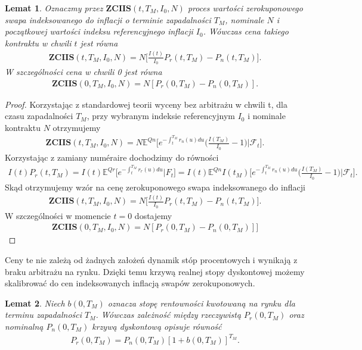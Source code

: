 \documentclass{mini}
\theoremstyle{mythstyle}
\newtheorem{Lemat}{Lemat}[chapter]
\begin{document}
	\begin{Lemat}
		Oznaczmy przez $\textbf{ZCIIS}(t,T_M,I_0,N)$ proces wartości zerokuponowego swapa indeksowanego do inflacji o terminie zapadalności $T_M$, nominale $N$ i początkowej wartości indeksu referencyjnego inflacji $I_0$. Wówczas cena takiego kontraktu w chwili $t$ jest równa
		\begin{eqnarray}
			\textbf{ZCIIS} (t,T_M,I_0,N) = N \bigg[\frac{I(t)}{I_0} P_r(t,T_M) - P_n(t,T_M)\bigg].
		\end{eqnarray}
		W szczególności cena w chwili 0 jest równa
		\begin{eqnarray}
			\textbf{ZCIIS} (0,T_M,I_0,N) = N [P_r(0,T_M) - P_n(0,T_M)].
		\end{eqnarray}
	\end{Lemat}
	\begin{proof}
	Korzystając z standardowej teorii wyceny bez arbitrażu w chwili t, dla czasu zapadalności $T_M$, przy wybranym indeksie referencyjnym $I_0$ i nominale kontraktu $N$ otrzymujemy
	\begin{eqnarray}
		\textbf{ZCIIS} (t,T_M,I_0,N) = N \mathbb{E}^{Qn} \bigg[e^{-\int_t^{T_M}r_n(u)du}\bigg(\frac{I(T_M)}{I_0}-1\bigg) \bigg| \mathcal{F}_t\bigg].
	\end{eqnarray}
	Korzystając z zamiany num\'{e}raire dochodzimy do równości
	\begin{eqnarray*}
		I(t) P_r (t,T_M) = I(t) \mathbb{E}^{Qr} \bigg[e^{-\int_t^{T_M}r_r(u)du} \bigg| F_t\bigg] = I(t) \mathbb{E}^{Qn} I(t_M) \bigg[e^{-\int_t^{T_M}r_n(u)du}\bigg(\frac{I(T_M)}{I_0}-1\bigg) \bigg| \mathcal{F}_t\bigg].
	\end{eqnarray*}
	Skąd otrzymujemy wzór na cenę zerokuponowego swapa indeksowanego do inflacji
	\begin{eqnarray}
		\textbf{ZCIIS} (t,T_M,I_0,N) = N \bigg[\frac{I(t)}{I_0} P_r(t,T_M) - P_n(t,T_M)\bigg].
	\end{eqnarray}
	W szczególności w momencie $t = 0$ dostajemy
	\begin{eqnarray}
		\textbf{ZCIIS} (0,T_M,I_0,N) = N [P_r(0,T_M) - P_n(0,T_M)]]
	\end{eqnarray}
	\end{proof}
	Ceny te nie zależą od żadnych założeń dynamik stóp procentowych i wynikają z braku arbitrażu na rynku. Dzięki temu krzywą realnej stopy dyskontowej możemy skalibrować do cen indeksowanych inflacją swapów zerokuponowych. \\
	\begin{Lemat}
		Niech $b(0,T_M)$ oznacza stopę rentowności kwotowaną na rynku dla terminu zapadalności $T_M$. Wówczas zależność między rzeczywistą $P_r(0,T_M)$ oraz nominalną $P_n(0,T_M)$ krzywą dyskontową opisuje równość
		\begin{eqnarray}
		P_r(0,T_M) = P_n(0,T_M)[1 + b(0,T_M)]^{T_M}.
		\end{eqnarray}
	\end{Lemat}
\end{document}

